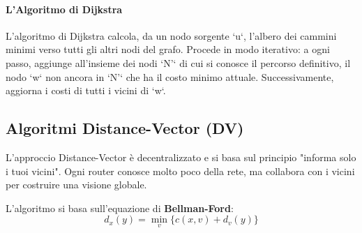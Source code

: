 \paragraph{L'Algoritmo di Dijkstra}
L'algoritmo di Dijkstra calcola, da un nodo sorgente `u`, l'albero dei cammini minimi verso tutti gli altri nodi del grafo. Procede in modo iterativo: a ogni passo, aggiunge all'insieme dei nodi `N'` di cui si conosce il percorso definitivo, il nodo `w` non ancora in `N'` che ha il costo minimo attuale. Successivamente, aggiorna i costi di tutti i vicini di `w`.


\subsection{Algoritmi Distance-Vector (DV)}
L'approccio Distance-Vector è decentralizzato e si basa sul principio "informa solo i tuoi vicini". Ogni router conosce molto poco della rete, ma collabora con i vicini per costruire una visione globale.

L'algoritmo si basa sull'equazione di \textbf{Bellman-Ford}:
$$ d_x(y) = \min_{v} \{ c(x,v) + d_v(y) \} $$

